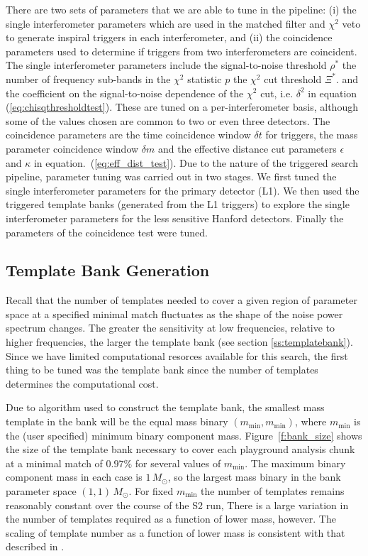 There are two sets of parameters that we are able to tune in the pipeline: (i)
the single interferometer parameters which are used in the matched filter and
$\chi^2$ veto to generate inspiral triggers in each interferometer, and (ii)
the coincidence parameters used to determine if triggers from two
interferometers are coincident. The single interferometer parameters include
the signal-to-noise threshold $\rho^\ast$ the number of frequency sub-bands in
the $\chi^2$ statistic $p$ the $\chi^2$ cut threshold $\Xi^\ast$.  and the
coefficient on the signal-to-noise dependence of the $\chi^2$ cut, i.e.
$\delta^2$ in equation (\ref{eq:chisqthresholdtest}). These are tuned on a
per-interferometer basis, although some of the values chosen are common to two
or even three detectors.  The coincidence parameters are the time coincidence
window $\delta t$ for triggers, the mass parameter coincidence window $\delta
m$ and the effective distance cut parameters $\epsilon$ and $\kappa$ in
equation.~(\ref{eq:eff_dist_test}).  Due to the nature of the triggered search
pipeline, parameter tuning was carried out in two stages. We first tuned the
single interferometer parameters for the primary detector (L1).  We then used
the triggered template banks (generated from the L1 triggers) to explore the
single interferometer parameters for the less sensitive Hanford detectors.
Finally the parameters of the coincidence test were tuned.

\subsection{Template Bank Generation}
\label{ss:tunebank}

Recall that the number of templates needed to cover a given region of
parameter space at a specified minimal match fluctuates as the shape of the
noise power spectrum changes. The greater the sensitivity at low frequencies,
relative to higher frequencies, the larger the template bank (see 
section \ref{ss:templatebank}). Since we have limited computational resorces
available for this search, the first thing to be tuned was the template bank
since the number of templates determines the computational cost.

Due to algorithm used to construct the template bank\cite{Owen:1998dk}, the
smallest mass template in the bank will be the equal mass binary
$(m_\mathrm{min},m_\mathrm{min})$, where $m_\mathrm{min}$ is the (user
specified) minimum binary component mass. Figure~\ref{f:bank_size} shows the
size of the template bank necessary to cover each playground analysis chunk at
a minimal match of $0.97\%$ for several values of $m_\mathrm{min}$.  The
maximum binary component mass in each case is $1\,M_\odot$, so the largest
mass binary in the bank parameter space $(1,1)\,M_\odot$. For fixed
$m_\mathrm{min}$ the number of templates remains reasonably constant over the
course of the S2 run, There is a large variation in the number of templates
required as a function of lower mass, however. The scaling of template number
as a function of lower mass is consistent with that described in
\cite{Owen:1998dk}.

